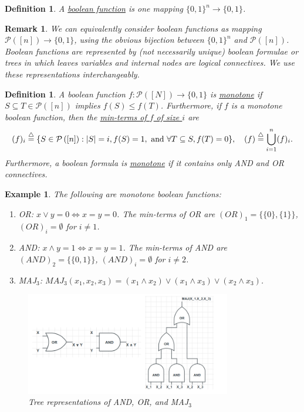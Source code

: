 \documentclass[twoside]{article}
\newcounter{tnum}
\newtheorem{definition}[tnum]{Definition}
\newtheorem{remark}[tnum]{Remark}
\newtheorem{example}[tnum]{Example}
\newcommand\ul{\underline}
\newcommand\pow[1]{\mathcal{P} \left( #1 \right)}
\begin{document}
\begin{definition}
A \ul{boolean function} is one mapping $\{0,1\}^n \rightarrow \{0,1\}$.
\end{definition}
\vspace{-0.2in}
\begin{remark}
We can equivalently consider boolean functions as mapping
$\pow{[n]} \rightarrow \{0,1\}$, using the obvious bijection between
$\{0,1\}^n$ and $\pow{[n]}$. Boolean functions are represented by (not
necessarily unique) boolean formulae or trees in which leaves variables and
internal nodes are logical connectives. We use these representations
interchangeably.
\end{remark}
\vspace{-0.2in}
\begin{definition}
A boolean function $f : \pow{[N]} \rightarrow \{0,1\}$ is \ul{monotone} if
$S \subseteq T \in \pow{[n]}$ implies $f(S) \leq f(T)$. Furthermore, if
$f$ is a monotone boolean function, then the \ul{min-terms of $f$ of size $i$}
are
\[(f)_i
    \buildrel\triangle\over =
        \{S \in \pow{[n]} : |S| = i, f(S) = 1,
                            \mbox{ and } \forall T \subseteq S, f(T) = 0\},
    \quad (f)
        \buildrel\triangle\over =
            \bigcup_{i = 1}^{n} (f)_i.\]
Furthermore, a boolean formula is \ul{monotone} if it contains only AND and OR
connectives.
\end{definition}
\begin{example}
\normalfont
The following are monotone boolean functions:
\begin{enumerate}
\item OR: $x \vee y = 0 \Leftrightarrow x = y = 0$. The min-terms of OR are
$(OR)_1 = \{\{0\},\{1\}\}$, $(OR)_i = \emptyset$ for $i \neq 1$.
\item AND: $x \wedge y = 1 \Leftrightarrow x = y = 1$. The min-terms of AND are
$(AND)_2 = \{\{0,1\}\}$, $(AND)_i = \emptyset$ for $i \neq 2$.
\item MAJ$_3$: $MAJ_3(x_1, x_2, x_3)
    = (x_1 \wedge x_2) \vee (x_1 \wedge x_3) \vee (x_2 \wedge x_3)$.
\end{enumerate}
\begin{figure}[h]
\begin{center}
\includegraphics[width=0.8\textwidth]{circuits.png}
\end{center}
\caption{Tree representations of AND, OR, and MAJ$_3$}
\label{fig:2a1}
\end{figure}
\end{example}
\end{document}
